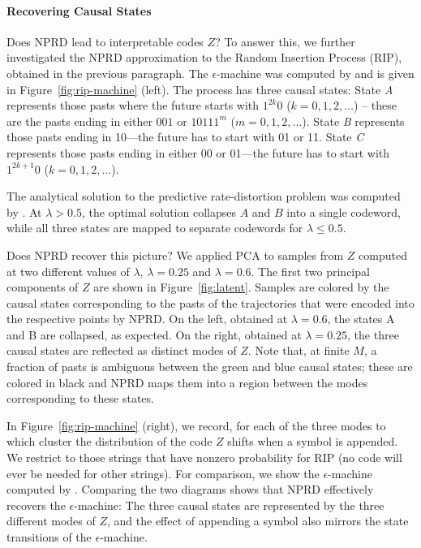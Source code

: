\documentclass[entropy,article,submit,moreauthors,pdftex,10pt,a4paper]{Definitions/mdpi}
\begin{document}
\paragraph{Recovering Causal States}
Does NPRD lead to interpretable codes $Z$?
To answer this, we further investigated the NPRD approximation to the Random Insertion Process (RIP), obtained in the previous paragraph.
The $\epsilon$-machine was computed by  \citet{marzen-predictive-2016} and is given in Figure~\ref{fig:rip-machine} (left).
The process has three causal states:
State \textit{A} represents those pasts where the future starts with $1^{2k}0$ ($k = 0, 1, 2, \dots$) -- these are the pasts ending in either $001$ or $10111^m$ ($m= 0, 1, 2, \dots$). %
State \textit{B} represents those pasts ending in 10---the future has to start with 01 or 11.
State \textit{C} represents those pasts ending in either 00 or 01---the future has to start with $1^{2k+1}0$ ($k = 0, 1, 2, \dots$).

The analytical solution to the predictive rate-distortion problem was computed by \citet{marzen-predictive-2016}.
At $\lambda > 0.5$, the optimal solution collapses $A$ and $B$ into a single codeword, while all three states are mapped to separate codewords for $\lambda \leq 0.5$.


Does NPRD recover this picture?
We applied PCA to samples from $Z$ computed at two different values of $\lambda$, $\lambda = 0.25$ and $\lambda = 0.6$. %
The first two principal components of $Z$ are shown in Figure~\ref{fig:latent}.
Samples are colored by the causal states corresponding to the pasts of the trajectories that were encoded into the respective points by NPRD.
On the left, obtained at $\lambda=0.6$, the states A and B are collapsed, as expected.
On the right, obtained at $\lambda=0.25$, the three causal states are reflected as distinct modes of $Z$.
Note that, at finite $M$, a fraction of pasts is ambiguous between the green and blue causal states; these are colored in black and NPRD maps them into a region between the modes corresponding to these states.

In Figure~\ref{fig:rip-machine} (right), we record, for each of the three modes to which cluster the distribution of the code $Z$ shifts when a symbol is appended.
We restrict to those strings that have nonzero probability for RIP (no code will ever be needed for other strings).
For comparison, we show the $\epsilon$-machine computed by \citet{marzen-predictive-2016}.
Comparing the two diagrams shows that NPRD effectively recovers the $\epsilon$-machine:
The three causal states are represented by the three different modes of $Z$, and the effect of appending a symbol also mirrors the state transitions of the $\epsilon$-machine.
\end{document}
